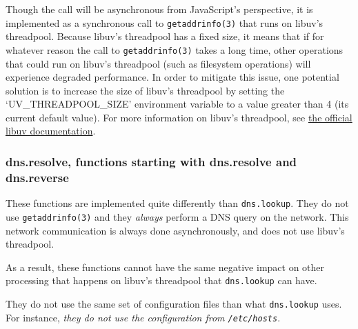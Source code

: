 Though the call will be asynchronous from JavaScript's perspective, it
is implemented as a synchronous call to \texttt{getaddrinfo(3)} that
runs on libuv's threadpool. Because libuv's threadpool has a fixed size,
it means that if for whatever reason the call to \texttt{getaddrinfo(3)}
takes a long time, other operations that could run on libuv's threadpool
(such as filesystem operations) will experience degraded performance. In
order to mitigate this issue, one potential solution is to increase the
size of libuv's threadpool by setting the `UV\_THREADPOOL\_SIZE'
environment variable to a value greater than 4 (its current default
value). For more information on libuv's threadpool, see
\href{http://docs.libuv.org/en/latest/threadpool.html}{the official
libuv documentation}.

\subsubsection{dns.resolve, functions starting with dns.resolve and
dns.reverse}\label{dns.resolve-functions-starting-with-dns.resolve-and-dns.reverse}

These functions are implemented quite differently than
\texttt{dns.lookup}. They do not use \texttt{getaddrinfo(3)} and they
\emph{always} perform a DNS query on the network. This network
communication is always done asynchronously, and does not use libuv's
threadpool.

As a result, these functions cannot have the same negative impact on
other processing that happens on libuv's threadpool that
\texttt{dns.lookup} can have.

They do not use the same set of configuration files than what
\texttt{dns.lookup} uses. For instance, \emph{they do not use the
configuration from \texttt{/etc/hosts}}.
